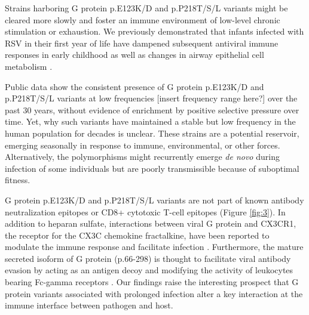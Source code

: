 \documentclass{article} %
\begin{document}
Strains harboring G protein p.E123K/D and p.P218T/S/L variants might be cleared more slowly and foster an immune environment of low-level chronic stimulation or exhaustion. 
We previously demonstrated that infants infected with RSV in their first year of life have dampened subsequent antiviral immune responses in early childhood \citep{chirkova2022effect} as well as changes in airway epithelial cell metabolism \citep{connelly2021metabolic}.

Public data show the consistent presence of G protein p.E123K/D and p.P218T/S/L variants at low frequencies [insert frequency range here?] over the past 30 years, without evidence of enrichment by positive selective pressure over time. Yet, why such variants have maintained a stable but low frequency in the human population for decades is unclear. These strains are a potential reservoir, emerging seasonally in response to immune, environmental, or other forces. Alternatively, the polymorphisms might recurrently emerge \textit{de novo} during infection of some individuals but are poorly transmissible because of suboptimal fitness. 

G protein p.E123K/D and p.P218T/S/L variants are not part of known antibody neutralization epitopes or CD8+ cytotoxic T-cell epitopes (Figure \ref{fig:3}). In addition to heparan sulfate, interactions between viral G protein and CX3CR1, the receptor for the CX3C chemokine fractalkine, have been reported to modulate the immune response and facilitate infection
\citep{levine1987demonstration, feldman1999identification, feldman2000fusion, johnson2015respiratory, tripp2001cx3c, jeong2015cx3cr1}.
Furthermore, the mature secreted isoform of G protein (p.66-298) is thought to facilitate viral antibody evasion by acting as an antigen decoy and modifying the activity of leukocytes bearing Fc-gamma receptors \citep{bukreyev2008secreted}. Our findings raise the interesting prospect that G protein variants associated with prolonged infection alter a key interaction at the immune interface between pathogen and host.
\end{document}
